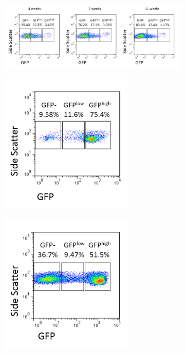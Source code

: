 \begin{figure}
	\begin{subfigure}{\textwidth}
	\includegraphics[width=\textwidth]{Figures/RAGhighlownegthyB.png}
	\caption{}
	\label{subfig:RAGhighlownegthyB}
	\end{subfigure}
	\begin{subfigure}{0.5\textwidth}
	\centering
	\includegraphics[width=0.7\textwidth]{Figures/7wkBMRAG.png}
	\caption{}
	\label{subfig:BMRAG}
	\end{subfigure}
	\begin{subfigure}{0.5\textwidth}
	\centering
	\includegraphics[width=0.7\textwidth]{Figures/7wktotalthyRAG.png}

\end{subfigure}
\end{figure}

